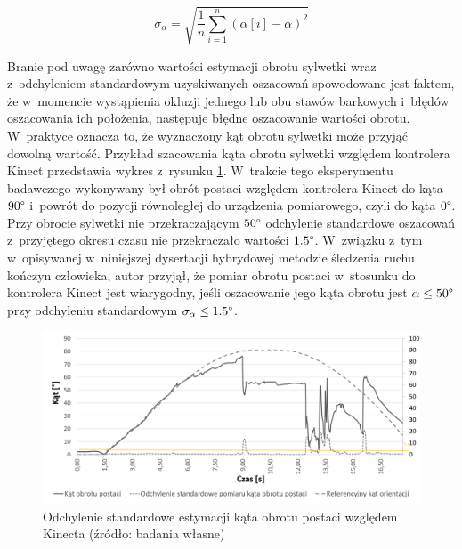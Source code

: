 \begin{equation}
	\sigma_\alpha = \sqrt{\frac{1}{n}\sum_{i=1}^{n}{(\alpha[i] - \overline{\alpha})^2}}
	\label{eq:stdDev}
\end{equation}
												
Branie pod uwagę zarówno wartości estymacji obrotu sylwetki wraz z~odchyleniem standardowym uzyskiwanych oszacowań spowodowane jest faktem, że w~momencie wystąpienia okluzji jednego lub obu stawów barkowych i~błędów oszacowania ich położenia, następuje błędne oszacowanie wartości obrotu. W~praktyce oznacza to, że wyznaczony kąt obrotu sylwetki może przyjąć dowolną wartość. Przykład szacowania kąta obrotu sylwetki względem kontrolera Kinect przedstawia wykres z~rysunku \ref{fig:hybrid:kinect:kinectRotationVariance}. W~trakcie tego eksperymentu badawczego wykonywany był obrót postaci względem kontrolera Kinect do kąta $90\degree$ i~powrót do pozycji równoległej do urządzenia pomiarowego, czyli do kąta $0\degree$. Przy obrocie sylwetki nie przekraczającym $50\degree$ odchylenie standardowe oszacowań z~przyjętego okresu czasu nie przekraczało wartości $1.5\degree$. W~związku z~tym w~opisywanej w~niniejszej dysertacji hybrydowej metodzie śledzenia ruchu kończyn człowieka, autor przyjął, że pomiar obrotu postaci w~stosunku do kontrolera Kinect jest wiarygodny, jeśli oszacowanie jego kąta obrotu jest $\alpha \le 50\degree$ przy odchyleniu standardowym $\sigma_\alpha\le 1.5 \degree$.
												
\begin{savenotes}
	\begin{figure}[!htb]
		\centering
		\includegraphics[width=\textwidth]{images/kinectRotationStdDev.png}
		\caption{Odchylenie standardowe estymacji kąta obrotu postaci względem Kinecta  (źródło: badania własne)}						
		\label{fig:hybrid:kinect:kinectRotationVariance}
		 \vspace{-10pt}
	\end{figure}
\end{savenotes}
														
